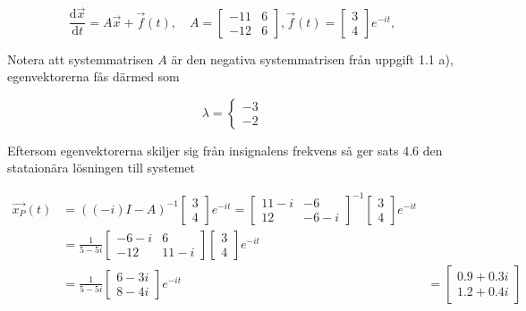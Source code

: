 \documentclass[a4paper]{article}
\newcommand{\mat}[1]{\bm{\mathit{#1}}}
\begin{document}
\begin{equation*}
  \frac{\text{d}\vec{x}}{\text{d}t} = \mat{A}\vec{x} + \vec{f}(t), \quad \mat{A} = \begin{bmatrix}-11 & 6\\-12 & 6\end{bmatrix}, \vec{f}(t) = \begin{bmatrix}3\\4\end{bmatrix}e^{-it},
\end{equation*}

\noindent Notera att systemmatrisen $\mat{A}$ är den negativa systemmatrisen
från uppgift 1.1 a), egenvektorerna fås därmed som

\begin{equation*}
  \lambda = \begin{cases}-3\\-2\end{cases}
\end{equation*}

\noindent Eftersom egenvektorerna skiljer sig från insignalens frekvens så ger
sats 4.6 den stataionära lösningen till systemet

\begin{align*}
  \vec{x_P}(t) &= ((-i)\mat{I} - \mat{A})^{-1}\begin{bmatrix}3\\4\end{bmatrix}e^{-it} = \begin{bmatrix}11-i & -6\\12 & -6-i\end{bmatrix}^{-1}\begin{bmatrix}3\\4\end{bmatrix}e^{-it}\\[2ex]
  &= \frac{1}{5-5i}\begin{bmatrix}-6-i & 6\\ -12& 11 - i\end{bmatrix}\begin{bmatrix}3\\4\end{bmatrix}e^{-it}\\[2ex]
  &= \frac{1}{5-5i}\begin{bmatrix}6-3i\\8-4i\end{bmatrix}e^{-it}
  &= \begin{bmatrix}0.9+0.3i\\1.2 + 0.4i\end{bmatrix}
\end{align*}
\end{document}
